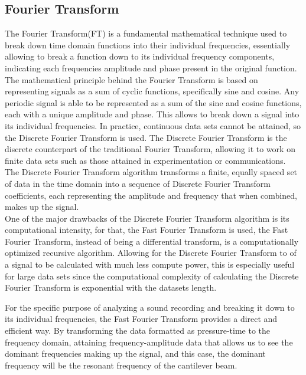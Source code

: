 \documentclass[a4paper,12pt]{article}
\begin{document}
    \subsection{Fourier Transform} \label{FT}%
    The Fourier Transform(FT) is a fundamental mathematical technique used to break down time domain functions into their individual frequencies, essentially allowing to break a function down to its individual frequency components, indicating each frequencies amplitude and phase present in the original function.\\
    The mathematical principle behind the Fourier Transform is based on representing signals as a sum of cyclic functions, specifically sine and cosine.
    Any periodic signal is able to be represented as a sum of the sine and cosine functions, each with a unique amplitude and phase. This allows to break down a signal into its individual frequencies.
    In practice, continuous data sets cannot be attained, so the Discrete Fourier Transform is used. The Discrete Fourier Transform is the discrete counterpart of the traditional Fourier Transform, allowing it to work on finite data sets such as those attained in experimentation or communications.
    The Discrete Fourier Transform algorithm transforms a finite, equally spaced set of data in the time domain into a sequence of Discrete Fourier Transform coefficients, each representing the amplitude and frequency that when combined, makes up the signal.\\
    One of the major drawbacks of the Discrete Fourier Transform algorithm is its computational intensity, for that, the Fast Fourier Transform is used, the Fast Fourier Transform, instead of being a differential transform, is a computationally optimized recursive algorithm. Allowing for the Discrete Fourier Transform to of a signal to be calculated with much less compute power, this is especially useful for large data sets since the computational complexity of calculating the Discrete Fourier Transform is exponential with the datasets length.\autocite{FFTBook}

    For the specific purpose of analyzing a sound recording and breaking it down to its individual frequencies, the Fast Fourier Transform provides a direct and efficient way. By transforming the data formatted as pressure-time to the frequency domain, attaining frequency-amplitude data that allows us to see the dominant frequencies making up the signal, and this case, the dominant frequency will be the resonant frequency of the cantilever beam.
\end{document}
